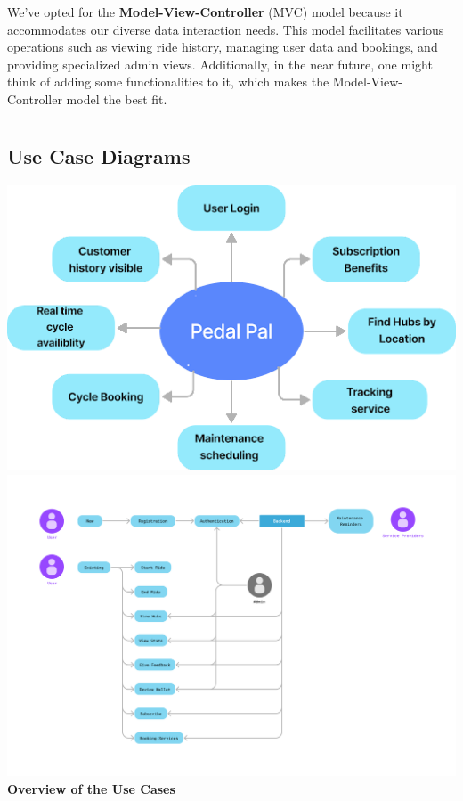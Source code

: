 \documentclass[11pt]{article}
\begin{document}
\vspace{0.5cm}
We've opted for the \textbf{Model-View-Controller} (MVC) model because it accommodates our diverse data interaction needs. This model facilitates various operations such as viewing ride history, managing user data and bookings, and providing specialized admin views. Additionally, in the near future, one might think of adding some functionalities to it, which makes the Model-View-Controller model the best fit.

\newpage
\section{}
\subsection{Use Case Diagrams}

\begin{center}
  \includegraphics[scale=0.75]{../srs/Overview.png}
  \includegraphics[scale=0.25]{../srs/usecase.png}\\
  \textbf{Overview of the Use Cases}
\end{center}
\end{document}
